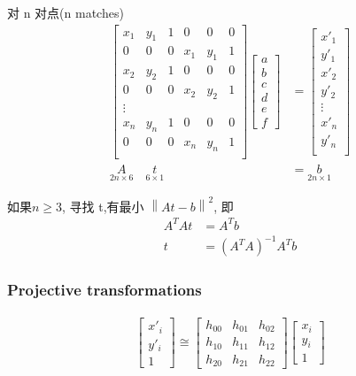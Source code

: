 对 n 对点(n matches)
\begin{align*}
    \begin{bmatrix}
        x_1&y_1&1&0&0&0\\0&0&0&x_1&y_1&1\\
        x_2&y_2&1&0&0&0\\0&0&0&x_2&y_2&1\\
        \vdots\\
        x_n&y_n&1&0&0&0\\0&0&0&x_n&y_n&1\\
    \end{bmatrix}\begin{bmatrix}
        a\\b\\c\\d\\e\\f
    \end{bmatrix}&=\begin{bmatrix}
        x'_1\\y'_1\\
        x'_2\\y'_2\\
        \vdots\\
        x'_n\\y'_n\\
    \end{bmatrix}\\
    \underset{2n\times 6}{A} \quad \underset{6\times 1}{t}&=\underset{2n\times 1}{b}
\end{align*}

如果$n\ge3$, 寻找 t,有最小 $\left\| At-b \right\|^2$, 即
\begin{align*}
    A^TAt&=A^Tb\\
    t&=(A^TA)^{-1}A^Tb
\end{align*}

\subsubsection{Projective transformations}

\begin{align*}
    \begin{bmatrix}
        x'_i\\y'_i\\1
    \end{bmatrix}\cong \begin{bmatrix}
        h_{00}&h_{01}&h_{02}\\
        h_{10}&h_{11}&h_{12}\\
        h_{20}&h_{21}&h_{22}
    \end{bmatrix}\begin{bmatrix}
        x_i\\y_i\\1
    \end{bmatrix}
\end{align*}


